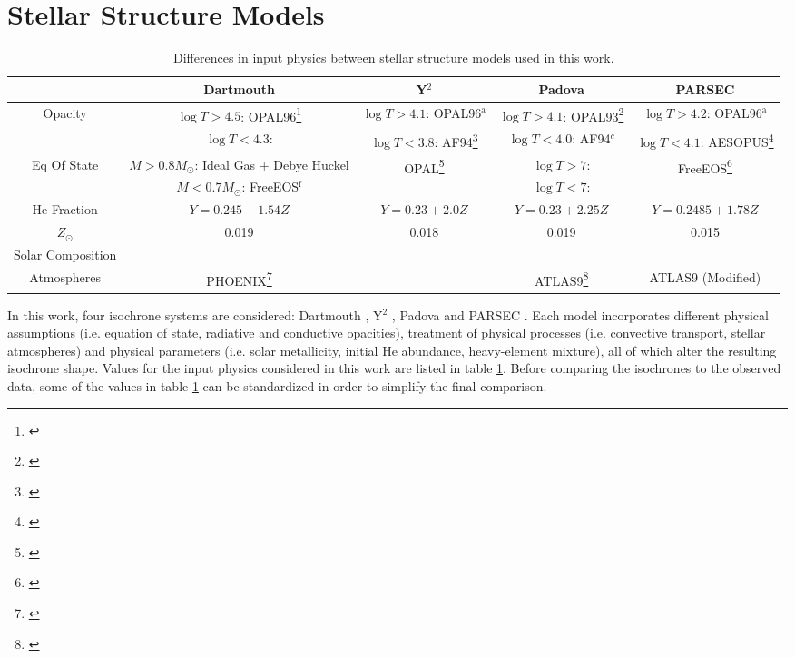 \documentclass[iop]{emulateapj}
\begin{document}
\section{Stellar Structure Models} \label{sec:isochrones}

\begin{table} \centering \tiny
\caption{Differences in input physics between stellar structure models used in this work. \label{tab:isoparams}}
\begin{tabular}{c||c|c|c|c} \hline \hline
	& Dartmouth & Y$^2$ & Padova & PARSEC \\ \hline
	\multirow{2}{*}{Opacity} & $\log T > 4.5$: OPAL96\footnote{ \citet{1996ApJ...464..943I}} & $\log T > 4.1$: OPAL96$^\text{a}$ & $\log T > 4.1$: OPAL93\footnote{\citet{1993ApJ...412..752I}} & $\log T > 4.2$: OPAL96$^\text{a}$ \\
			& $\log T < 4.3$: \citet{2005ApJ...623..585F} & $\log T < 3.8$: AF94\footnote{\citet{1994ApJ...437..879A}} & $\log T < 4.0$: AF94$^c$ & $\log T < 4.1$: AESOPUS\footnote{ \citet{2009AA...508.1539M}} \\ \hline
	\multirow{2}{*}{Eq Of State} & $M > 0.8 M_\odot$: Ideal Gas + Debye Huckel & \multirow{2}{*}{OPAL\footnote{\citet{1996ApJ...456..902R}}} & $\log T > 7$: \citet{1965ZA.....61..241K} & \multirow{2}{*}{FreeEOS\footnote{\citet{Irwin:2012uw}}} \\
			& $M < 0.7 M_\odot$: FreeEOS$^\text{f}$ & & $\log T < 7$: \citet{1990ApJ...350..300M} & \\ \hline
	He Fraction & $Y = 0.245 + 1.54 Z$ & $Y = 0.23 + 2.0 Z$ & $Y = 0.23 + 2.25 Z$ & $Y = 0.2485 + 1.78 Z$ \\
	$Z_\odot$ & 0.019 & 0.018 & 0.019 & 0.015 \\ 
	Solar Composition & \citet{1998SSRv...85..161G} & \citet{1993PhST...47..133G} & \citet{1993PhST...47..133G} & \citet{2011SoPh..268..255C} \\ \hline
	Atmospheres & PHOENIX\footnote{ \citet{2005ApJ...623..585F}} & \citet{1998AAS..130...65L} & ATLAS9\footnote{ \citet{2003IAUS..210P.A20C}} & ATLAS9 (Modified) \\ \hline
\end{tabular}
\end{table}

In this work, four isochrone systems are considered: Dartmouth \citep{Dotter:2007fh}, Y$^2$ \citep{2001ApJS..136..417Y}, Padova \citep{2002AA...391..195G} and PARSEC \citep{2012MNRAS.427..127B}. Each model incorporates different physical assumptions (i.e. equation of state, radiative and conductive opacities), treatment of physical processes (i.e. convective transport, stellar atmospheres) and physical parameters (i.e. solar metallicity, initial He abundance, heavy-element mixture), all of which alter the resulting isochrone shape. Values for the input physics considered in this work are listed in table \ref{tab:isoparams}. Before comparing the isochrones to the observed data, some of the values in table \ref{tab:isoparams} can be standardized in order to simplify the final comparison.
\end{document}
